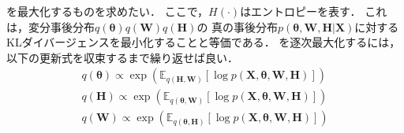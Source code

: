 を最大化するものを求めたい．
ここで，$H(\cdot)$はエントロピーを表す．
これは，変分事後分布$q(\bm\theta) q(\bm{W}) q(\bm{H})$の
真の事後分布$p(\bm\theta,\bm{W},\bm{H}|\bm{X})$に対するKLダイバージェンスを最小化することと等価である．
を逐次最大化するには，
以下の更新式を収束するまで繰り返せば良い．
\begin{eqnarray}
 \!\!
 q(\bm\theta) \propto \exp(\mathbb{E}_{q(\bm{H},\bm{W})}[\log p(\bm{X},\bm\theta,\bm{W},\bm{H})])
 \label{eq:q_t}
 \\
 \!\!
 q(\bm{H}) \propto \exp(\mathbb{E}_{q(\bm\theta,\bm{W})}[\log p(\bm{X},\bm\theta,\bm{W},\bm{H})])
 \label{eq:q_w}
 \\
 \!\!
 q(\bm{W}) \propto \exp(\mathbb{E}_{q(\bm\theta,\bm{H})}[\log p(\bm{X},\bm\theta,\bm{W},\bm{H})]) 
 \label{eq:q_h}
\end{eqnarray}
